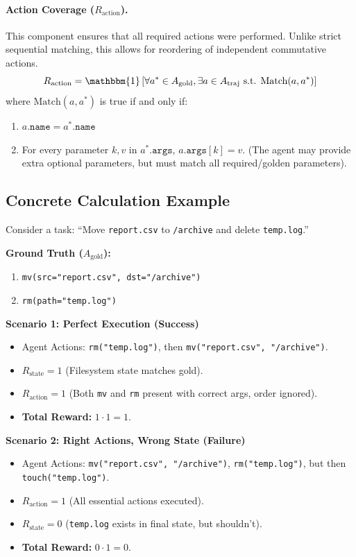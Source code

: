 \documentclass{article}
\theoremstyle{plain}
\theoremstyle{definition}
\theoremstyle{remark}
\begin{document}
\paragraph{Action Coverage ($R_{\text{action}}$).}
This component ensures that all required actions were performed. Unlike strict sequential matching, this allows for reordering of independent commutative actions.
\begin{equation}
    R_{\text{action}} = \mathbbm{1}\left[ \forall a^* \in A_{\text{gold}}, \exists a \in A_{\text{traj}} \text{ s.t. } \text{Match}(a, a^*) \right]
\end{equation}
where $\text{Match}(a, a^*)$ is true if and only if:
\begin{enumerate}
    \item $a.\texttt{name} = a^*.\texttt{name}$
    \item For every parameter $k, v$ in $a^*.\texttt{args}$, $a.\texttt{args}[k] = v$. (The agent may provide extra optional parameters, but must match all required/golden parameters).
\end{enumerate}

\subsection{Concrete Calculation Example}

Consider a task: ``Move \texttt{report.csv} to \texttt{/archive} and delete \texttt{temp.log}.''

\textbf{Ground Truth ($A_{\text{gold}}$):}
\begin{enumerate}
    \item \texttt{mv(src="report.csv", dst="/archive")}
    \item \texttt{rm(path="temp.log")}
\end{enumerate}

\textbf{Scenario 1: Perfect Execution (Success)}
\begin{itemize}
    \item Agent Actions: \texttt{rm("temp.log")}, then \texttt{mv("report.csv", "/archive")}.
    \item $R_{\text{state}} = 1$ (Filesystem state matches gold).
    \item $R_{\text{action}} = 1$ (Both \texttt{mv} and \texttt{rm} present with correct args, order ignored).
    \item \textbf{Total Reward:} $1 \cdot 1 = 1$.
\end{itemize}

\textbf{Scenario 2: Right Actions, Wrong State (Failure)}
\begin{itemize}
    \item Agent Actions: \texttt{mv("report.csv", "/archive")}, \texttt{rm("temp.log")}, but then \texttt{touch("temp.log")}.
    \item $R_{\text{action}} = 1$ (All essential actions executed).
    \item $R_{\text{state}} = 0$ (\texttt{temp.log} exists in final state, but shouldn't).
    \item \textbf{Total Reward:} $0 \cdot 1 = 0$.
\end{itemize}
\end{document}

